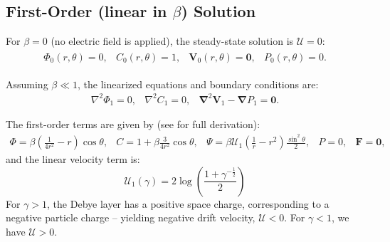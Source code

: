 \documentclass[10pt]{ijnam}
\newcommand{\pars}[1]{\left(#1\right)}
\newcommand\Laplacian{\nabla^2}
\newcommand\bnabla{\boldsymbol{\nabla}}
\newcommand\bLaplacian{\boldsymbol{\nabla}^2}
\newcommand\bV{\boldsymbol{V}}
\newcommand\bF{\boldsymbol{F}}
\newcommand\bzero{\boldsymbol{0}}
\newcommand\cU{\mathscr{U}}
\begin{document}
\subsection{First-Order (linear in $\beta$) Solution} \label{app:linear}

For $\beta = 0$ (no electric field is applied), the steady-state solution is $\cU = 0$:
\begin{eqnarray*}\begin{array}{cccc}
\varPhi_0(r,\theta) = 0, &
C_0(r,\theta) = 1, &
\bV_0(r,\theta) = \bzero, &
P_0(r,\theta) = 0.
\end{array}\end{eqnarray*}

Assuming $\beta \ll 1$, the linearized equations and boundary conditions are:
\begin{eqnarray*}
\Laplacian \varPhi_1 = 0, &
\Laplacian C_1 = 0, &
\bLaplacian \bV_1 - \bnabla P_1 = \bzero.
\end{eqnarray*}

The first-order terms are given by (see \cite{yariv2010migration} for full derivation):
\begin{equation} \begin{array}{ccccc}
\varPhi = \beta \pars{\frac{1}{4r^2} - r}\cos\theta, &
C = 1 + \beta \frac{3}{4r^2} \cos\theta, &
\Psi = \beta \cU_1 \pars{\frac{1}{r} - r^2} \frac{\sin^2\theta}{2}, &
P = 0, &
\bF = \bzero,
\end{array} \end{equation}
and the linear velocity term is:
\begin{equation} \label{eq:linear_velocity}
\cU_1(\gamma) = 2 \log \pars{\frac{1 + \gamma^{-\frac{1}{2}}}{2}}
\end{equation}
For $\gamma > 1$, the Debye layer has a positive space charge, 
corresponding to a negative particle charge -- 
yielding negative drift velocity, $\cU < 0$. 
For $\gamma < 1$, we have $\cU > 0$.

\end{document}
